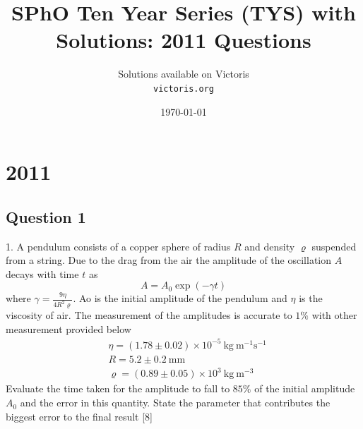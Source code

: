 \documentclass{article}
\title{SPhO Ten Year Series (TYS) with Solutions: 2011 Questions}
\author{
    Solutions available on Victoris\\
    \texttt{victoris.org}
}
\date{\today}
\begin{document}
\maketitle


\section{2011}

\subsection{Question 1}
1. A pendulum consists of a copper sphere of radius $R$ and density $\varrho$ suspended from a string. Due to the drag from the air the amplitude of the oscillation $A$ decays with time $t$ as
$$
A=A_{0} \exp (-\gamma t)
$$
where $\gamma=\frac{9 \eta}{4 R^{2} \varrho}$. Ao is the initial amplitude of the pendulum and $\eta$ is the viscosity of air. The measurement of the amplitudes is accurate to $1\%$ with other measurement provided below
$$
\begin{aligned}
	&\eta=(1.78 \pm 0.02) \times 10^{-5} \mathrm{~kg} \mathrm{~m}^{-1} \mathrm{s}^{-1} \\
	&R=5.2 \pm 0.2 \mathrm{~mm} \\
	&\varrho=(0.89 \pm 0.05) \times 10^{3} \mathrm{~kg} \mathrm{~m}^{-3}
\end{aligned}
$$
Evaluate the time taken for the amplitude to fall to $85 \%$ of the initial amplitude $A_{0}$ and the error in this quantity. State the parameter that contributes the biggest error to the final result [8]
\end{document}
